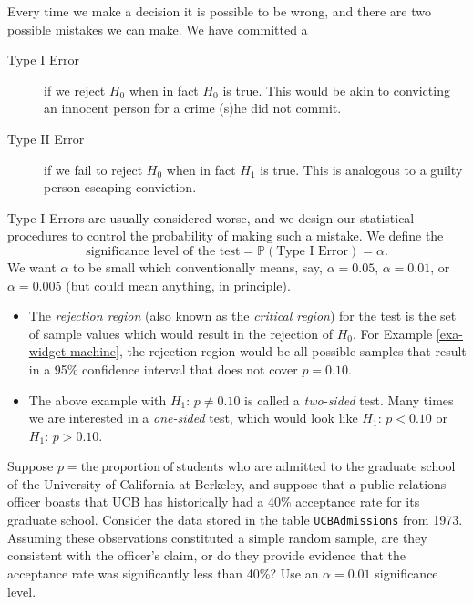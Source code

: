 \begin{rem}
Every time we make a decision it is possible to be wrong, and there
are two possible mistakes we can make. We have committed a
\begin{description}
\item[{Type I Error}] if we reject \(H_{0}\) when in fact \(H_{0}\) is
true. This would be akin to convicting an innocent
person for a crime (s)he did not commit.
\item[{Type II Error}] if we fail to reject \(H_{0}\) when in fact
\(H_{1}\) is true. This is analogous to a guilty
person escaping conviction.
\end{description}
\end{rem}

Type I Errors are usually considered worse, and we
design our statistical procedures to control the probability of making
such a mistake. We define the
\begin{equation}
\mbox{significance level of the test} = \mathbb{P}(\mbox{Type I Error}) = \alpha.
\end{equation}
We want \(\alpha\) to be small which conventionally means, say,
\(\alpha=0.05\), \(\alpha=0.01\), or \(\alpha=0.005\) (but could mean
anything, in principle).
\begin{itemize}
\item The \emph{rejection region} (also known as the \emph{critical region}) for the
test is the set of sample values which would result in the rejection
of \(H_{0}\). For Example \ref{exa-widget-machine}, the rejection region
would be all possible samples that result in a 95\% confidence
interval that does not cover \(p = 0.10\).
\item The above example with \(H_{1}:\,p \neq 0.10\) is called a
\emph{two-sided} test. Many times we are interested in a \emph{one-sided}
test, which would look like \(H_{1}:\,p < 0.10\) or \(H_{1}:\,p >
  0.10\).
\end{itemize}

\label{exa-prop-test-pvalue-A} Suppose \(p = \mathrm{the\ proportion\ of\
students}\) who are admitted to the graduate school of the University
of California at Berkeley, and suppose that a public relations officer
boasts that UCB has historically had a 40\% acceptance rate for its
graduate school. Consider the data stored in the table \texttt{UCBAdmissions}
from 1973. Assuming these observations constituted a simple random
sample, are they consistent with the officer's claim, or do they
provide evidence that the acceptance rate was significantly less than
40\%? Use an \(\alpha = 0.01\) significance level.

